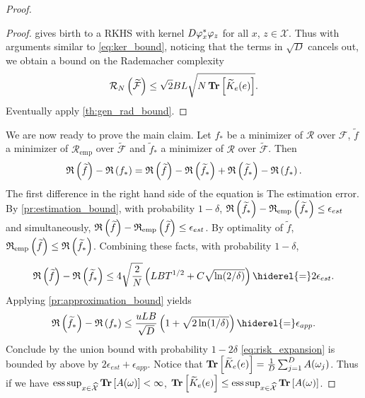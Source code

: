 \begin{proof}
\begin{proof}
        gives birth to a \acs{RKHS} with kernel $D \Phi_x^\adjoint \Phi_z$ for
        all $x$, $z\in\mathcal{X}$. Thus with arguments similar to
        \cref{eq:ker_bound}, noticing that the terms in $\sqrt{D}$ cancels out,
        we obtain a bound on the Rademacher complexity
        \begin{dmath*}
            \mathcal{R}_N\left(\widetilde{\mathcal{F}}\right) \le
            \sqrt{2}BL\sqrt{N\Tr\left[ \widetilde{K}_e(e) \right]}.
        \end{dmath*}
        Eventually apply \cref{th:gen_rad_bound}.
    \end{proof}
    We are now ready to prove the main claim. Let $f_*$ be a minimizer of
    $\mathcal{R}$ over $\mathcal{F}$, $\widetilde{f}$ a minimizer of
    $\mathcal{R}_{\text{emp}}$ over $\widetilde{\mathcal{F}}$ and
    $\widetilde{f}_*$ a minimizer of $\mathcal{R}$ over
    $\widetilde{\mathcal{F}}$. Then
    \begin{dmath}
        \label{eq:risk_expansion}
        \risk{\widetilde{f}} - \risk{f_*} = \risk{\widetilde{f}} -
        \risk{\widetilde{f}_*} + \risk{\widetilde{f}_*} - \risk{f_*}.
    \end{dmath}
    The first difference in the right hand side of the equation is The
    estimation error. By \cref{pr:estimation_bound}, with probability
    $1-\delta$, $\mathfrak{R}\left(\widetilde{f}_*\right) - \mathfrak{R}_{\text{emp}}\left(\widetilde{f}_*\right)\le
    \epsilon_{est}$ and simultaneously, $\mathfrak{R}\left(\widetilde{f}\right) -
    \mathfrak{R}_{\text{emp}}\left(\widetilde{f}\right) \le \epsilon_{est}$. By optimality of
    $\widetilde{f}$, $\mathfrak{R}_{\text{emp}}\left(\widetilde{f}\right) \le \mathfrak{R}\left(\widetilde{f}_*\right)$.
    Combining these facts, with probability $1 - \delta$,
    \begin{dmath*}
        \risk{\widetilde{f}} - \risk{\widetilde{f}_*} \le
        4\sqrt{\frac{2}{N}}\left( LBT^{1/2} + C\sqrt{\ln(2/\delta)}\right)
        \hiderel{=} 2\epsilon_{est}.
    \end{dmath*}
    Applying \cref{pr:approximation_bound} yields
    \begin{dmath*}
        \risk{\widetilde{f}_*} - \risk{f_*} \le \frac{uLB}{\sqrt{D}}\left(1 +
        \sqrt{2\ln(1/\delta)} \right) \hiderel{=} \epsilon_{app}.
    \end{dmath*}
    Conclude by the union bound with probability $1 - 2\delta$
    \cref{eq:risk_expansion} is bounded by above by $2\epsilon_{est} +
    \epsilon_{app}$. Notice that $\operatorname{{\mathbf{Tr}}}\left[ \widetilde{K}_e(e)
    \right]=\frac{1}{D}\sum_{j=1}^D A(\omega_j)$. Thus if we have
    $\operatorname*{ess\,sup}_{x\in\widehat{\mathcal{X}}} \operatorname{{\mathbf{Tr}}}\left[A(\omega)\right] < \infty$,
    $\operatorname{{\mathbf{Tr}}}\left[ \widetilde{K}_e(e) \right]\le\operatorname*{ess\,sup}_{x\in\widehat{\mathcal{X}}}
    \operatorname{{\mathbf{Tr}}}\left[ A(\omega) \right]$.
\end{proof}

